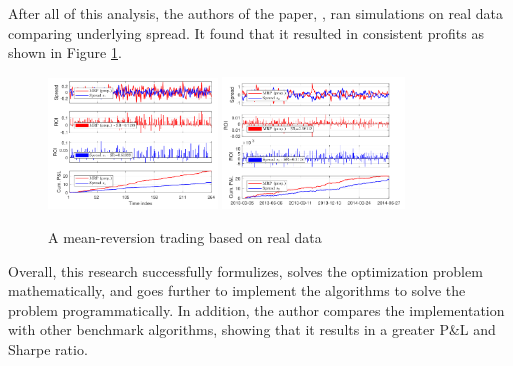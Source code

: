 \noindent After all of this analysis, the authors of the paper, \cite{8450775, ZipingZhao2019OMPW}, ran simulations on real data comparing underlying spread. It found that it resulted in consistent profits as shown in Figure \ref{fig:ROIsMRP}.
\\[3mm]
\begin{figure}[htb!]
    \centering
    \includegraphics[width=0.4\textwidth]{background/Images/rois1.png}
    \includegraphics[width=0.43\textwidth]{background/Images/rois2.png}
    \caption{A mean-reversion trading based on real data~\cite{ZipingZhao2019OMPW}}
    \label{fig:ROIsMRP}
\end{figure}

\noindent Overall, this research successfully formulizes, solves the optimization problem mathematically, and goes further to implement the algorithms to solve the problem programmatically. In addition, the author compares the implementation with other benchmark algorithms, showing that it results in a greater P\&L and Sharpe ratio.

